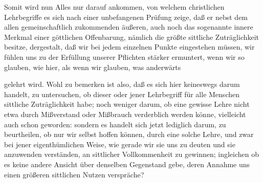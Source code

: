Somit wird nun Alles nur darauf ankommen, von welchem christlichen Lehrbegriffe es sich nach einer unbefangenen Prüfung zeige, daß er nebst dem allen gemeinschaftlich zukommenden äußeren, auch noch das sogenannte innere Merkmal einer göttlichen Offenbarung, nämlich die größte sittliche Zuträglichkeit besitze, dergestalt, daß wir bei jedem einzelnen Punkte eingestehen müssen, wir fühlen uns zu der Erfüllung unserer Pflichten stärker ermuntert, wenn wir so glauben, wie hier, als wenn wir glauben, was anderwärts \par
gelehrt wird. Wohl zu bemerken ist also, daß es sich hier keineswegs darum handelt, zu untersuchen, ob dieser oder jener Lehrbegriff für alle Menschen sittliche Zuträglichkeit habe; noch weniger darum, ob eine gewisse Lehre nicht etwa durch Mißverstand oder Mißbrauch verderblich werden könne, vielleicht auch schon geworden: sondern es handelt sich jetzt lediglich darum, zu beurtheilen, ob nur wir selbst hoffen können, durch eine solche Lehre, und zwar bei jener eigenthümlichen Weise, wie gerade wir sie uns zu deuten und sie anzuwenden verständen, an sittlicher Vollkommenheit zu gewinnen; ingleichen ob es keine andere Ansicht über denselben Gegenstand gebe, deren Annahme uns einen größeren sittlichen Nutzen verspräche? \par
